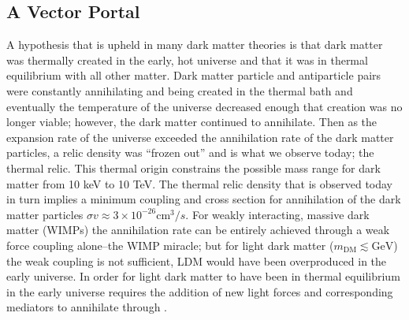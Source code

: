 \documentclass[a4paper,12pt]{article}
\begin{document}
    \subsection{A Vector Portal}

        A hypothesis that is upheld in many dark matter theories is that dark
        matter was thermally created in the early, hot universe and that it was
        in thermal equilibrium with all other matter.  Dark matter particle and
        antiparticle pairs were constantly annihilating and being created in the
        thermal bath and eventually the temperature of the universe decreased enough
        that creation was no longer viable; however, the dark matter continued
        to annihilate. Then as the expansion rate of the universe exceeded the
        annihilation rate of the dark matter particles, a relic density was
        ``frozen out'' and is what we observe today; the thermal relic. This
        thermal origin constrains the possible mass range for dark matter from
        10 keV to 10 TeV. The thermal relic density that is observed today in
        turn implies a minimum coupling and cross section for annihilation of
        the dark matter particles $\sigma v \approx 3 \times 10^{-26}
        \text{cm}^3/s$. For weakly interacting, massive dark matter (WIMPs) the
        annihilation rate can be entirely achieved through a weak force coupling
        alone--the WIMP miracle; but for light dark matter ($m_{\text{DM}} \lesssim \text{GeV}$)
        the weak coupling is not sufficient, LDM would have been overproduced in
        the early universe.  In order for light dark matter to have been in
        thermal equilibrium in the early universe requires the addition of new
        light forces and corresponding mediators to annihilate through
        \cite{Holdom}.
\end{document}
